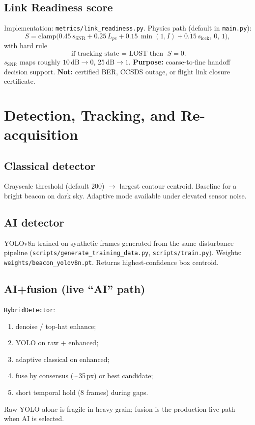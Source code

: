 \documentclass[11pt,a4paper]{article}
\begin{document}
\subsection{Link Readiness score}
Implementation: \texttt{metrics/link\_readiness.py}.
Physics path (default in \texttt{main.py}):
\begin{equation}
S
=
\mathrm{clamp}\!\big(
0.45\,s_{\mathrm{SNR}}
+
0.25\,L_{pe}
+
0.15\,\min(1,I)
+
0.15\,s_{\mathrm{lock}}
,\,0,\,1\big),
\end{equation}
with hard rule
\begin{equation}
\text{if tracking state $=$ LOST then } S=0.
\end{equation}
$s_{\mathrm{SNR}}$ maps roughly $10\,\mathrm{dB}\rightarrow 0$, $25\,\mathrm{dB}\rightarrow 1$.
\textbf{Purpose:} coarse-to-fine handoff decision support.
\textbf{Not:} certified BER, CCSDS outage, or flight link closure certificate.

\section{Detection, Tracking, and Re-acquisition}

\subsection{Classical detector}
Grayscale threshold (default 200) $\rightarrow$ largest contour centroid.
Baseline for a bright beacon on dark sky.
Adaptive mode available under elevated sensor noise.

\subsection{AI detector}
YOLOv8n trained on synthetic frames generated from the same disturbance pipeline
(\texttt{scripts/generate\_training\_data.py}, \texttt{scripts/train.py}).
Weights: \texttt{weights/beacon\_yolov8n.pt}.
Returns highest-confidence box centroid.

\subsection{AI+fusion (live ``AI'' path)}
\texttt{HybridDetector}:
\begin{enumerate}[leftmargin=1.4em]
  \item denoise / top-hat enhance;
  \item YOLO on raw + enhanced;
  \item adaptive classical on enhanced;
  \item fuse by consensus ($\sim$35\,px) or best candidate;
  \item short temporal hold (8 frames) during gaps.
\end{enumerate}
Raw YOLO alone is fragile in heavy grain; fusion is the production live path when AI is selected.
\end{document}
